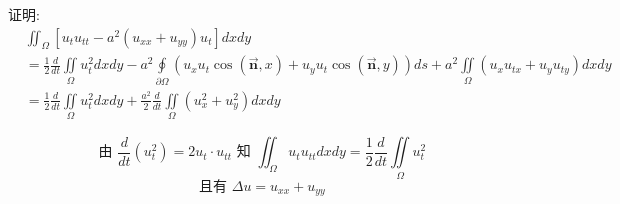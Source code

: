 \begin{questions}
证明: 
$$
\begin{aligned}
&\iint_{\Omega}\left[u_{t} u_{t t}-a^{2}\left(u_{x x}+u_{y y}\right) u_{t}\right] d x d y\\
&=\frac{1}{2} \frac{d}{d t} \iint\limits_{\Omega} u_{t}^{2} d x d y-a^{2} \oint\limits_{\partial \Omega}\left(u_{x} u_{t} \cos (\vec{\boldsymbol n}, x)+u_{y} u_{t} \cos (\vec{\boldsymbol n}, y)\right) d s +a^{2} \iint\limits_{\Omega}\left(u_{x} u_{t x}+u_{y} u_{t y}\right) d x d y \\
&=\frac{1}{2} \frac{d}{d t} \iint\limits_{\Omega} u_{t}^{2} d x d y+\frac{a^{2}}{2} \frac{d}{d t} \iint\limits_{\Omega}\left(u_{x}^{2}+u_{y}^{2}\right) d x d y
\end{aligned}
$$
\begin{solution}
$$
\text { 由 } \frac{d}{d t}\left(u_{t}^{2}\right)=2 u_{t} \cdot u_{t t} \text { 知 } \iint_{\Omega} u_{t} u_{t t} d x d y=\frac{1}{2} \frac{d}{d t} \iint\limits_{\Omega} u_{t}^{2}
$$
$$\text { 且有 } \Delta u=u_{x x}+u_{y y}$$


\end{solution}
\end{questions}
